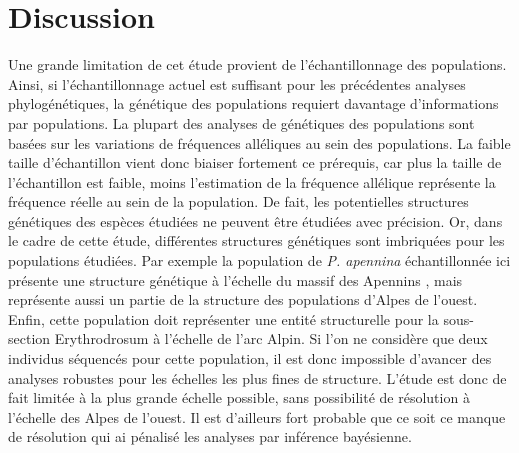 \section{Discussion}

Une grande limitation de cet étude provient de l'échantillonnage des populations.
 Ainsi, si l'échantillonnage actuel est suffisant pour les précédentes analyses phylogénétiques, la génétique des populations requiert davantage d'informations par populations.
 La plupart des analyses de génétiques des populations sont basées sur les variations de fréquences alléliques au sein des populations.
 La faible taille d'échantillon vient donc biaiser fortement ce prérequis, car plus la taille de l'échantillon est faible, moins l'estimation de la fréquence allélique représente la fréquence réelle au sein de la population.
 De fait, les potentielles structures génétiques des espèces étudiées ne peuvent être étudiées avec précision.
 Or, dans le cadre de cette étude, différentes structures génétiques sont imbriquées pour les populations étudiées.
 Par exemple la population de \textit{P. apennina} échantillonnée ici présente une structure génétique à l'échelle du massif des Apennins \citep{Crema2009}, mais représente aussi un partie de la structure des populations d'Alpes de l'ouest.
 Enfin, cette population doit représenter une entité structurelle pour la sous-section Erythrodrosum à l'échelle de l'arc Alpin.
 Si l'on ne considère que deux individus séquencés pour cette population, il est donc impossible d'avancer des analyses robustes pour les échelles les plus fines de structure.
 L'étude est donc de fait limitée à la plus grande échelle possible, sans possibilité de résolution à l'échelle des Alpes de l'ouest.
 Il est d'ailleurs fort probable que ce soit ce manque de résolution qui ai pénalisé les analyses par inférence bayésienne.


